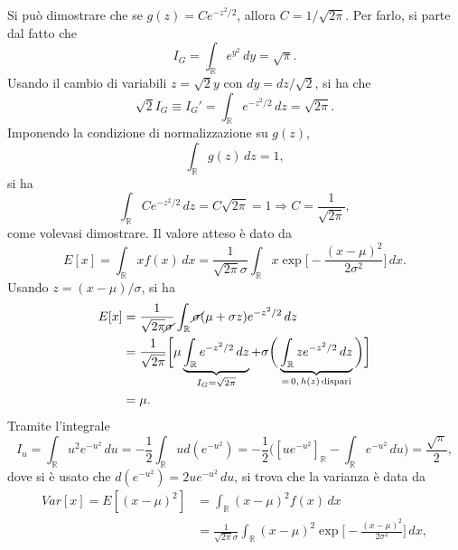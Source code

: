 \documentclass{article}
\theoremstyle{remark}
\newcommand{\intR}{\int_{\mathbb{R}}}
\begin{document}
Si può dimostrare che se $g(z) = C e^{-z^2/2}$, allora $C = 1/\sqrt{2\pi}$. Per farlo, si parte dal fatto che 
\begin{equation}
    I_G = \intR e^{y^2}\,dy = \sqrt{\pi}.
\end{equation}
Usando il cambio di variabili $z = \sqrt{2}y$ con $dy = dz/\sqrt{2}$, si ha che 
\begin{equation}
    \sqrt{2}I_G \equiv I_G' = \intR e^{-z^2/2}\,dz = \sqrt{2\pi}.
\end{equation}
Imponendo la condizione di normalizzazione su $g(z)$,
\begin{equation}
    \intR g(z)\,dz = 1,
\end{equation}
si ha
\begin{equation}
    \intR Ce^{-z^2/2}\,dz = C\sqrt{2\pi} = 1 \Longrightarrow C = \frac{1}{\sqrt{2\pi}},
\end{equation}
come volevasi dimostrare. Il valore atteso è dato da
\begin{equation}
    E[x] = \intR xf(x)\,dx = \frac{1}{\sqrt{2\pi}\sigma}\intR x\exp{\bigg[-\frac{(x - \mu)^2}{2\sigma^2}\bigg]}\,dx.
\end{equation}
Usando $z = (x - \mu)/\sigma$, si ha
\begin{equation}
    \begin{split}
        E[x] &= \frac{1}{\sqrt{2\pi}\cancel{\sigma}}\intR\cancel{\sigma}(\mu + \sigma z)e^{-z^2/2}\,dz \\
        &= \frac{1}{\sqrt{2\pi}}\bigg[\mu\underbrace{\intR e^{-z^2/2}\,dz}_{I_G = \sqrt{2\pi}} + \sigma\bigg(\underbrace{\intR ze^{-z^2/2}\,dz}_{=\,0,\,h(z)\,\mathrm{dispari}}\bigg)\bigg] \\
        &= \mu.
    \end{split}
\end{equation}
Tramite l'integrale 
\begin{equation}
    I_u = \intR u^2e^{-u^2}\,du = -\frac{1}{2}\intR ud(e^{-u^2}) = -\frac{1}{2}\bigg([ue^{-u^2}]_{\mathbb{R}} - \intR e^{-u^2}\,du\bigg) = \frac{\sqrt{\pi}}{2},
\end{equation}
dove si è usato che $d(e^{-u^2}) = 2ue^{-u^2}\,du$, si trova che la varianza è data da
\begin{equation}
    \begin{split}
        Var[x] = E[(x - \mu)^2] &= \intR (x - \mu)^2f(x)\,dx \\
        &= \frac{1}{\sqrt{2\pi}\sigma}\intR(x - \mu)^2\exp{\bigg[-\frac{(x - \mu)^2}{2\sigma^2}\bigg]}\,dx,
    \end{split}
\end{equation}
\end{document}
